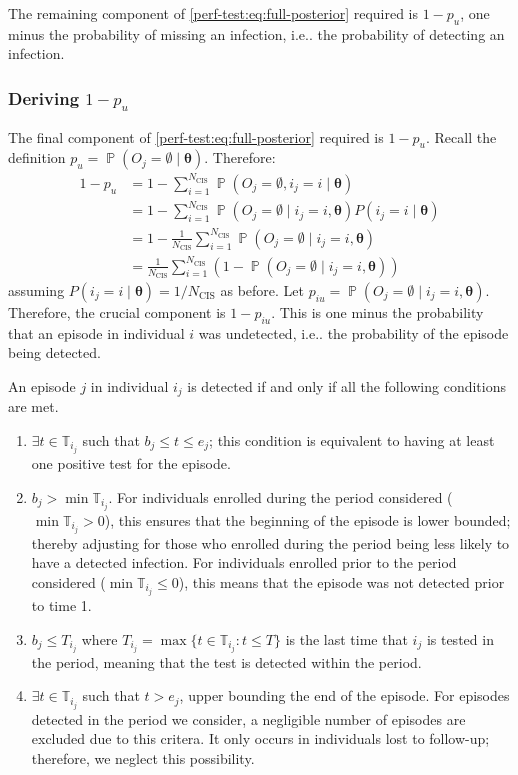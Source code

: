 \documentclass[12pt]{article}
\makeatletter
\DeclareMathOperator{\prob}{\mathbb{P}}
\renewcommand{\vec}[1]{\bm{#1}}
\newcommand{\ssep}{:}
\newcommand{\Ncis}{N_\text{CIS}}
\newcommand{\sched}{\mathbb{T}}
\DeclareRobustCommand\onedot{\futurelet\@let@token\@onedot}
\def\@onedot{\ifx\@let@token.\else.\null\fi\xspace}
\def\ie{i.e\onedot} \def\Ie{{I.e}\onedot}
\makeatother
\begin{document}
The remaining component of \cref{perf-test:eq:full-posterior} required is $1- p_u$, one minus the probability of missing an infection, \ie the probability of detecting an infection.

\subsubsection{Deriving $1 - p_u$} \label{perf-test:sec:prob-undetected}

The final component of \cref{perf-test:eq:full-posterior} required is $1 - p_u$.
Recall the definition $p_u = \prob(O_j = \emptyset \mid \vec{\theta})$.
Therefore:
\begin{align}
  1 - p_u
  &= 1 - \sum_{i=1}^{\Ncis} \prob(O_j = \emptyset, i_j = i \mid \vec{\theta}) \\
  &= 1 - \sum_{i=1}^{\Ncis} \prob(O_j = \emptyset \mid i_j = i, \vec{\theta}) P(i_j = i \mid \vec{\theta}) \\
  &= 1 - \frac{1}{\Ncis}\sum_{i=1}^{\Ncis} \prob(O_j = \emptyset \mid i_j = i, \vec{\theta}) \\
  &= \frac{1}{\Ncis} \sum_{i=1}^{\Ncis} (1 - \prob(O_j = \emptyset \mid i_j = i, \vec{\theta}))
  \label{perf-test:eq:pu}
\end{align}
assuming $P(i_j = i \mid \vec{\theta}) = 1/\Ncis$ as before.
Let $p_{iu} = \prob(O_j = \emptyset \mid i_j = i, \vec{\theta})$.
Therefore, the crucial component is $1 - p_{iu}$.
This is one minus the probability that an episode in individual $i$ was undetected, \ie the probability of the episode being detected.

An episode $j$ in individual $i_j$ is detected if and only if all the following conditions are met.
\begin{enumerate}
    \item $\exists t \in \sched_{i_j}$ such that $b_j \leq t \leq e_j$; this condition is equivalent to having at least one positive test for the episode.
    \item $b_j > \min \sched_{i_j}$.
      For individuals enrolled during the period considered ($\min \sched_{i_j} > 0$), this ensures that the beginning of the episode is lower bounded; thereby adjusting for those who enrolled during the period being less likely to have a detected infection.
      For individuals enrolled prior to the period considered ($\min \sched_{i_j} \leq 0$), this means that the episode was not detected prior to time 1.
    \item $b_j \leq T_{i_j}$ where $T_{i_j} = \max \{ t \in \sched_{i_j} \ssep t \leq T \}$ is the last time that $i_j$ is tested in the period, meaning that the test is detected within the period.
    \item $\exists t \in \sched_{i_j}$ such that $t > e_j$, upper bounding the end of the episode.
      For episodes detected in the period we consider, a negligible number of episodes are excluded due to this critera.
      It only occurs in individuals lost to follow-up; therefore, we neglect this possibility.
\end{enumerate}
\end{document}
